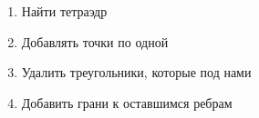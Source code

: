 \begin{enumerate}
	\item Найти тетраэдр
	\item Добавлять точки по одной
	\item Удалить треугольники, которые под нами
	\item Добавить грани к оставшимся ребрам
\end{enumerate}


